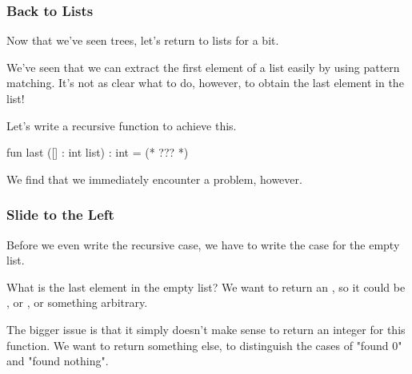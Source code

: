 \documentclass[aspectratio=169]{beamer}
\begin{document}

\begin{frame}[fragile]
  \frametitle{Back to Lists}

  Now that we've seen trees, let's return to lists for a bit.

  \pause
  \vspace{\fill}

  We've seen that we can extract the first element of a list easily by
  using pattern matching. It's not as clear what to do, however, to obtain
  the last element in the list!

  \pause
  \vspace{\fill}

  Let's write a recursive  function to achieve this.

  \pause
  \begin{codeblock}
    fun last ([] : int list) : int = (* ??? *)
  \end{codeblock}

  \pause
  \vspace{\fill}

  We find that we immediately encounter a problem, however.
\end{frame}

\begin{frame}[fragile]
  \frametitle{Slide to the Left}

  Before we even write the recursive case, we have to write the case for
  the empty list.

  \pause
  \vspace{\fill}

  What is the last element in the empty list? We want to return an
  , so it could be , or , or something arbitrary.

  \pause
  \vspace{\fill}

  The bigger issue is that it simply doesn't make sense to return an integer
  for this function. We want to return something else, to distinguish the
  cases of "found 0" and "found nothing".
\end{frame}
\end{document}
